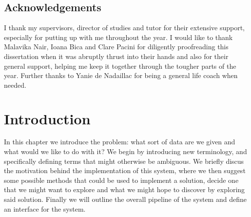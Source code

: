 \documentclass[12pt,twoside,notitlepage]{report}
\begin{document}

\listoffigures

\listoftables

\lstlistoflistings











\clearpage
\section*{Acknowledgements}

I thank my supervisors, director of studies and tutor for their extensive support, especially for putting up with me 
throughout the year. I would like to thank Malavika Nair, Ioana Bica and Clare Pacini for diligently proofreading 
this dissertation when it was abruptly thrust into their hands and also for their general support, helping me keep it together 
through the tougher parts of the year. Further thanks to Yanie de Nadaillac for being a general life coach when needed.











\cleardoublepage        %

\setcounter{page}{1}
\pagestyle{headings}
















\cleardoublepage
\chapter{Introduction}
    In this chapter we introduce the problem: what sort of data are we given and what would we like to do with it? We 
    begin by introducing new terminology, and specifically defining terms that might otherwise be ambiguous. We briefly 
    discus the motivation behind the implementation of this system, where we then suggest some possible methods that 
    could be used to implement a solution, decide one that we might want to explore and what we might hope to discover 
    by exploring said solution. Finally we will outline the overall pipeline of the system and define an interface for 
    the system.
\end{document}
